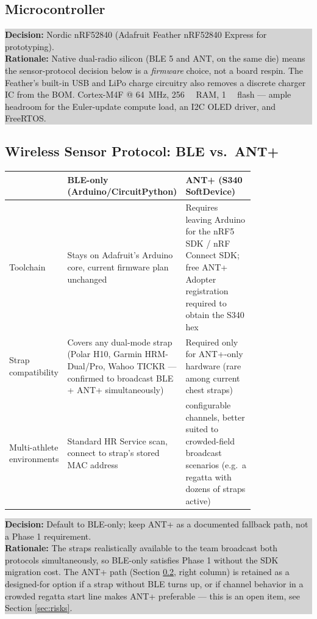\documentclass[11pt, letterpaper]{article}
\newcommand{\decision}[2]{%
  \par\vspace{0.4em}
  \noindent\colorbox{lightgray}{\parbox{0.97\linewidth}{\vspace{0.3em}
  \textbf{\color{trinityblue} Decision:} #1 \\[0.3em]
  \textbf{Rationale:} #2
  \vspace{0.3em}}}%
  \par\vspace{0.4em}
}
\begin{document}
\subsection{Microcontroller}

\decision{Nordic nRF52840 (Adafruit Feather nRF52840 Express for prototyping).}
{Native dual-radio silicon (BLE 5 and ANT, on the same die) means the sensor-protocol decision
below is a \emph{firmware} choice, not a board respin. The Feather's built-in USB and LiPo
charge circuitry also removes a discrete charger IC from the BOM. Cortex-M4F @ \SI{64}{\mega\hertz},
\SI{256}{\kilo\byte} RAM, \SI{1}{\mega\byte} flash --- ample headroom for the Euler-update
compute load, an I2C OLED driver, and FreeRTOS.}

\subsection{Wireless Sensor Protocol: BLE vs.\ ANT+}
\label{sec:protocol}

\begin{center}
\small
\begin{tabular}{>{\raggedright\arraybackslash}p{0.20\linewidth}>{\raggedright\arraybackslash}p{0.30\linewidth}>{\raggedright\arraybackslash}p{0.30\linewidth}}
\toprule
 & \textbf{BLE-only (Arduino/CircuitPython)} & \textbf{ANT+ (S340 SoftDevice)} \\
\midrule
Toolchain & Stays on Adafruit's Arduino core, current firmware plan unchanged & Requires leaving
Arduino for the nRF5 SDK / nRF Connect SDK; free ANT+ Adopter registration required to obtain
the S340 hex \\
Strap compatibility & Covers any dual-mode strap (Polar H10, Garmin HRM-Dual/Pro, Wahoo TICKR
--- confirmed to broadcast BLE + ANT+ simultaneously) & Required only for ANT+-only hardware
(rare among current chest straps) \\
Multi-athlete environments & Standard HR Service scan, connect to strap's stored MAC address & 
15 configurable channels, better suited to crowded-field broadcast scenarios (e.g.\ a regatta
with dozens of straps active) \\
\bottomrule
\end{tabular}
\end{center}

\decision{Default to BLE-only; keep ANT+ as a documented fallback path, not a Phase 1 requirement.}
{The straps realistically available to the team broadcast both protocols simultaneously, so
BLE-only satisfies Phase 1 without the SDK migration cost. The ANT+ path (Section
\ref{sec:protocol}, right column) is retained as a designed-for option if a strap without BLE
turns up, or if channel behavior in a crowded regatta start line makes ANT+ preferable ---
this is an open item, see Section \ref{sec:risks}.}
\end{document}
